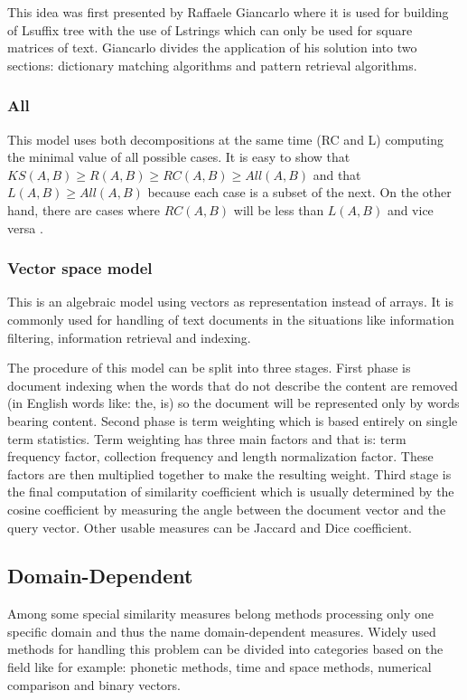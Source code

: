 This idea was first presented by Raffaele Giancarlo \cite{lshape} where it is used for building of Lsuffix tree with the use of Lstrings which can only be used for square matrices of text. Giancarlo divides the application of his solution into two sections: dictionary matching algorithms and pattern retrieval algorithms.

\subsubsection{All}
This model uses both decompositions at the same time (RC and L) computing the minimal value of all possible cases. It
is easy to show that $KS(A,B) \geq R(A,B) \geq RC(A,B) \geq All(A,B)$ and that $L(A,B) \geq All(A,B) $ because each case is a subset of the next. On the other hand, there are cases where $RC(A,B)$ will be less than $L(A,B)$ and vice versa \cite{mdApproxPM}.


\subsubsection{Vector space model}
This is an algebraic model using vectors as representation instead of arrays. It is commonly used for handling of text documents in the situations like information filtering, information retrieval and indexing.

The procedure of this model can be split into three stages. First phase is document indexing when the words that do not describe the content are removed (in English words like: the, is) so the document will be represented only by words bearing content. Second phase is term weighting which is based entirely on single term statistics. Term weighting has three main factors and that is: term frequency factor, collection frequency and length normalization factor. These factors are then multiplied together to make the resulting weight. Third stage is the final computation of similarity coefficient which is usually determined by the cosine coefficient by measuring the angle between the document vector and the query vector. Other usable measures can be Jaccard and Dice coefficient.

\subsection{Domain-Dependent}
Among some special similarity measures belong methods processing only one specific domain and thus the name domain-dependent measures.
Widely used methods for handling this problem can be divided into categories based on the field like for example: phonetic methods, time and space methods, numerical comparison and binary vectors. 

